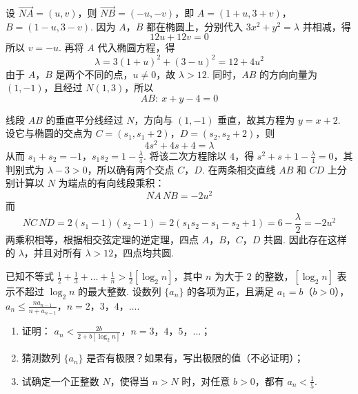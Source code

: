 \begin{solution}
设 \(\overrightarrow{NA}=(u,v)\)，则 \(\overrightarrow{NB}=(-u,-v)\)，即 \(A=(1+u,3+v)\)，\(B=(1-u,3-v)\). 因为 \(A\)，\(B\) 都在椭圆上，分别代入 \(3x^{2}+y^{2}=\lambda\) 并相减，得
\[
12u+12v=0
\]
所以 \(v=-u\). 再将 \(A\) 代入椭圆方程，得
\[
\lambda=3(1+u)^{2}+(3-u)^{2}=12+4u^{2}
\]
由于 \(A\)，\(B\) 是两个不同的点，\(u\neq0\)，故 \(\lambda>12\). 同时，\(AB\) 的方向向量为 \((1,-1)\)，且经过 \(N(1,3)\)，所以
\[
AB:\ x+y-4=0
\]

线段 \(AB\) 的垂直平分线经过 \(N\)，方向与 \((1,-1)\) 垂直，故其方程为 \(y=x+2\). 设它与椭圆的交点为 \(C=(s_1,s_1+2)\)，\(D=(s_2,s_2+2)\)，则
\[
4s^{2}+4s+4=\lambda
\]
从而 \(s_1+s_2=-1\)，\(s_1s_2=1-\frac{\lambda}{4}\).
将该二次方程除以 \(4\)，得 \(s^2+s+1-\frac{\lambda}{4}=0\)，其判别式为 \(\lambda-3>0\)，所以确有两个交点 \(C\)，\(D\). 在两条相交直线 \(AB\) 和 \(CD\) 上分别计算以 \(N\) 为端点的有向线段乘积：
\[
\overline{NA}\,\overline{NB}=-2u^{2}
\]
而
\[
\overline{NC}\,\overline{ND}=2(s_1-1)(s_2-1)=2\left(s_1s_2-s_1-s_2+1\right)=6-\frac{\lambda}{2}=-2u^{2}
\]
两乘积相等，根据相交弦定理的逆定理，四点 \(A\)，\(B\)，\(C\)，\(D\) 共圆. 因此存在这样的 \(\lambda\)，并且对所有 \(\lambda>12\)，四点均共圆.
\end{solution}

\begin{problem}
已知不等式 \(\frac{1}{2} + \frac{1}{3} + \dots + \frac{1}{n} > \frac{1}{2}\left[\log_{2} n\right]\)，其中 \(n\) 为大于 \(2\) 的整数，\([\log_{2} n]\) 表示不超过 \(\log_{2} n\) 的最大整数. 设数列 \(\{a_n\}\) 的各项为正，且满足 \(a_1 = b\)（\(b > 0\)），\(a_n \leqslant \frac{n a_{n-1}}{n + a_{n-1}}\)，\(n = 2\)，\(3\)，\(4\)，\(\dots\).

\begin{enumerate}
\item 证明： \(a_{n} < \frac{2b}{2 + b[\log_{2} n]}\)，\(n = 3\)，\(4\)，\(5\)，\(\dots\)；
\item 猜测数列 \(\{a_{n}\}\) 是否有极限？如果有，写出极限的值（不必证明）；
\item 试确定一个正整数 \(N\)，使得当 \(n > N\) 时，对任意 \(b > 0\)，都有 \(a_{n} < \frac{1}{5}\).
\end{enumerate}
\end{problem}

